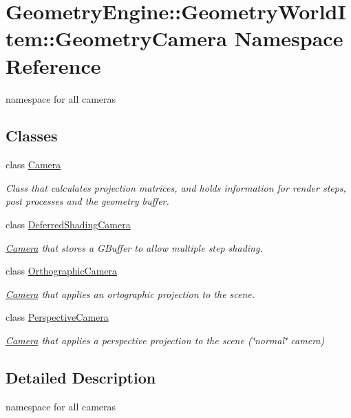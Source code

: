 \hypertarget{namespace_geometry_engine_1_1_geometry_world_item_1_1_geometry_camera}{}\section{Geometry\+Engine\+::Geometry\+World\+Item\+::Geometry\+Camera Namespace Reference}
\label{namespace_geometry_engine_1_1_geometry_world_item_1_1_geometry_camera}


namespace for all cameras  


\subsection*{Classes}
\begin{DoxyCompactItemize}
\item 
class \mbox{\hyperlink{class_geometry_engine_1_1_geometry_world_item_1_1_geometry_camera_1_1_camera}{Camera}}
\begin{DoxyCompactList}\small\item\em Class that calculates projection matrices, and holds information for render steps, post processes and the geometry buffer. \end{DoxyCompactList}\item 
class \mbox{\hyperlink{class_geometry_engine_1_1_geometry_world_item_1_1_geometry_camera_1_1_deferred_shading_camera}{Deferred\+Shading\+Camera}}
\begin{DoxyCompactList}\small\item\em \mbox{\hyperlink{class_geometry_engine_1_1_geometry_world_item_1_1_geometry_camera_1_1_camera}{Camera}} that stores a G\+Buffer to allow multiple step shading. \end{DoxyCompactList}\item 
class \mbox{\hyperlink{class_geometry_engine_1_1_geometry_world_item_1_1_geometry_camera_1_1_orthographic_camera}{Orthographic\+Camera}}
\begin{DoxyCompactList}\small\item\em \mbox{\hyperlink{class_geometry_engine_1_1_geometry_world_item_1_1_geometry_camera_1_1_camera}{Camera}} that applies an ortographic projection to the scene. \end{DoxyCompactList}\item 
class \mbox{\hyperlink{class_geometry_engine_1_1_geometry_world_item_1_1_geometry_camera_1_1_perspective_camera}{Perspective\+Camera}}
\begin{DoxyCompactList}\small\item\em \mbox{\hyperlink{class_geometry_engine_1_1_geometry_world_item_1_1_geometry_camera_1_1_camera}{Camera}} that applies a perspective projection to the scene (\char`\"{}normal\char`\"{} camera) \end{DoxyCompactList}\end{DoxyCompactItemize}


\subsection{Detailed Description}
namespace for all cameras 